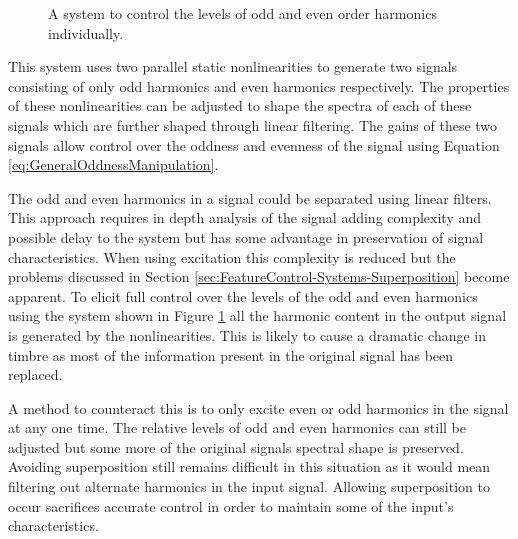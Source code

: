 \begin{figure}[h!]
				\caption{A system to control the levels of odd and even order harmonics individually.}
				\label{fig:HarmonicParitySystem}
			\end{figure}

			This system uses two parallel static nonlinearities to generate two signals consisting of only odd
			harmonics and even harmonics respectively. The properties of these nonlinearities can be adjusted
			to shape the spectra of each of these signals which are further shaped through linear filtering.
			The gains of these two signals allow control over the oddness and evenness of the signal using
			Equation \ref{eq:GeneralOddnessManipulation}.

			The odd and even harmonics in a signal could be separated using linear filters. This approach
			requires in depth analysis of the signal adding complexity and possible delay to the system but has
			some advantage in preservation of signal characteristics. When using excitation this complexity is
			reduced but the problems discussed in Section \ref{sec:FeatureControl-Systems-Superposition} become
			apparent. To elicit full control over the levels of the odd and even harmonics using the system
			shown in Figure \ref{fig:HarmonicParitySystem} all the harmonic content in the output signal is
			generated by the nonlinearities. This is likely to cause a dramatic change in timbre as most of the
			information present in the original signal has been replaced. 

			A method to counteract this is to only excite even or odd harmonics in the signal at any one time.
			The relative levels of odd and even harmonics can still be adjusted but some more of the original
			signals spectral shape is preserved. Avoiding superposition still remains difficult in this
			situation as it would mean filtering out alternate harmonics in the input signal. Allowing
			superposition to occur sacrifices accurate control in order to maintain some of the input's
			characteristics.

